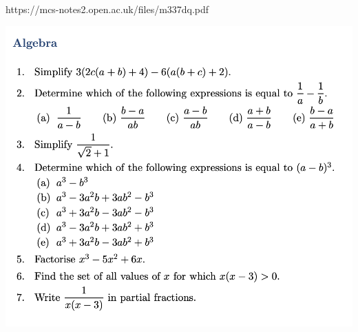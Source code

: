 https://mcs-notes2.open.ac.uk/files/m337dq.pdf

\includegraphics[width=400pt]{img/ou-entry-2236.png}

